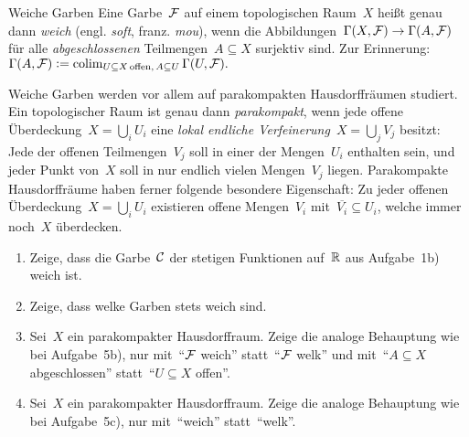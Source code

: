 \documentclass{uebblatt}
\begin{document}
\begin{aufgabe}{Weiche Garben}
Eine Garbe~$\mathcal{F}$ auf einem topologischen Raum~$X$ heißt genau dann \emph{weich}
(engl. \emph{soft}, franz. \emph{mou}), wenn die Abbildungen~$\Gamma(X,\mathcal{F}) \to
\Gamma(A,\mathcal{F})$ für alle \emph{abgeschlossenen} Teilmengen~$A \subseteq X$
surjektiv sind. Zur Erinnerung:~$\Gamma(A,\mathcal{F}) \vcentcolon= \operatorname{colim}\limits_{{U \subseteq
X\,\text{offen},\,A \subseteq U}} \Gamma(U,\mathcal{F}).$

Weiche Garben werden vor allem auf parakompakten Hausdorffräumen studiert. Ein
topologischer Raum ist genau dann \emph{parakompakt}, wenn jede offene
Überdeckung~$X = \bigcup_i U_i$ eine \emph{lokal endliche Verfeinerung}~$X =
\bigcup_j V_j$ besitzt: Jede der offenen Teilmengen~$V_j$ soll in einer der
Mengen~$U_i$ enthalten sein, und jeder Punkt von~$X$ soll in nur endlich
vielen Mengen~$V_j$ liegen. Parakompakte Hausdorffräume haben ferner folgende
besondere Eigenschaft: Zu jeder offenen Überdeckung~$X = \bigcup_i U_i$
existieren offene Mengen~$V_i$ mit~$\overline{V_i} \subseteq U_i$, welche immer
noch~$X$ überdecken.

\begin{enumerate}
\item Zeige, dass die Garbe~$\mathcal{C}$ der stetigen Funktionen auf~$\mathbb{R}$ aus
Aufgabe~1b) weich ist.
\item Zeige, dass welke Garben stets weich sind.
\item Sei~$X$ ein parakompakter Hausdorffraum. Zeige die analoge Behauptung wie
bei Aufgabe~5b), nur mit~"`$\mathcal{F}$ weich"' statt~"`$\mathcal{F}$ welk"' und mit~"`$A
\subseteq X$ abgeschlossen"' statt~"`$U \subseteq X$ offen"'.
\item Sei~$X$ ein parakompakter Hausdorffraum. Zeige die analoge Behauptung wie
bei Aufgabe~5c), nur mit~"`weich"' statt~"`welk"'.
\end{enumerate}
\end{aufgabe}
\end{document}
